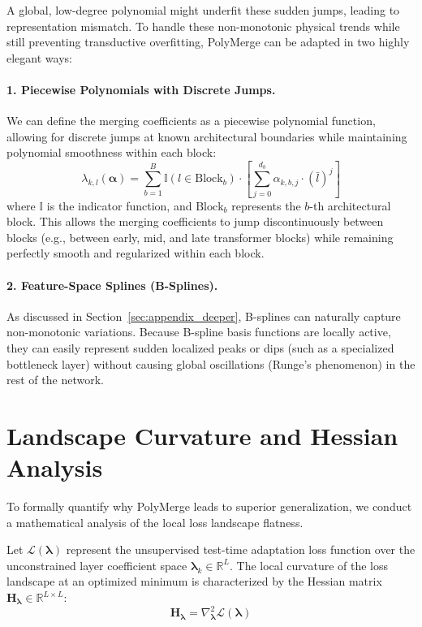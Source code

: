 A global, low-degree polynomial might underfit these sudden jumps, leading to representation mismatch. To handle these non-monotonic physical trends while still preventing transductive overfitting, PolyMerge can be adapted in two highly elegant ways:

\paragraph{1. Piecewise Polynomials with Discrete Jumps.}
We can define the merging coefficients as a piecewise polynomial function, allowing for discrete jumps at known architectural boundaries while maintaining polynomial smoothness within each block:
\begin{equation}
\lambda_{k, l}(\boldsymbol{\alpha}) = \sum_{b=1}^B \mathbb{I}(l \in \text{Block}_b) \cdot \left[ \sum_{j=0}^{d_b} \alpha_{k, b, j} \cdot \left( \bar{l} \right)^j \right]
\end{equation}
where $\mathbb{I}$ is the indicator function, and $\text{Block}_b$ represents the $b$-th architectural block. This allows the merging coefficients to jump discontinuously between blocks (e.g., between early, mid, and late transformer blocks) while remaining perfectly smooth and regularized within each block.

\paragraph{2. Feature-Space Splines (B-Splines).}
As discussed in Section~\ref{sec:appendix_deeper}, B-splines can naturally capture non-monotonic variations. Because B-spline basis functions are locally active, they can easily represent sudden localized peaks or dips (such as a specialized bottleneck layer) without causing global oscillations (Runge's phenomenon) in the rest of the network.


\section{Landscape Curvature and Hessian Analysis}
\label{sec:appendix_hessian}

To formally quantify why PolyMerge leads to superior generalization, we conduct a mathematical analysis of the local loss landscape flatness. 

Let $\mathcal{L}(\boldsymbol{\lambda})$ represent the unsupervised test-time adaptation loss function over the unconstrained layer coefficient space $\boldsymbol{\lambda}_k \in \mathbb{R}^L$. The local curvature of the loss landscape at an optimized minimum is characterized by the Hessian matrix $\mathbf{H}_{\boldsymbol{\lambda}} \in \mathbb{R}^{L \times L}$:
\begin{equation}
\mathbf{H}_{\boldsymbol{\lambda}} = \nabla^2_{\boldsymbol{\lambda}} \mathcal{L}(\boldsymbol{\lambda})
\end{equation}

